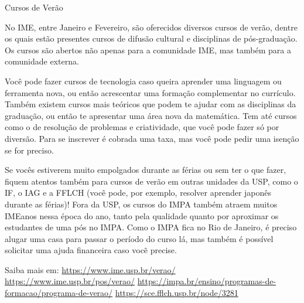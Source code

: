 \begin{secao}{Cursos de Verão}

No IME, entre Janeiro e Fevereiro, são oferecidos diversos cursos de verão,
dentre os quais estão presentes cursos de difusão cultural e disciplinas de
pós-graduação. Os cursos são abertos não apenas para a comunidade IME, mas
também para a comunidade externa.

Você pode fazer cursos de tecnologia caso queira aprender uma linguagem ou ferramenta nova, 
ou então acrescentar uma formação complementar no currículo. Também existem cursos mais teóricos 
que podem te ajudar com as disciplinas da graduação, ou então te apresentar uma área nova da matemática. 
Tem até cursos como o de resolução de problemas e criatividade, que você pode fazer só por diversão. 
Para se inscrever é cobrada uma taxa, mas você pode pedir uma isenção se for preciso. 

Se vocês estiverem muito empolgados durante as férias ou sem ter o que fazer, fiquem atentos também para 
cursos de verão em outras unidades da USP, como o IF, o IAG e a FFLCH (você pode, por exemplo, resolver aprender 
japonês durante as férias)! Fora da USP, os cursos do IMPA também atraem muitos IMEanos nessa época do ano, tanto 
pela qualidade quanto por aproximar os estudantes de uma pós no IMPA. Como o IMPA fica no Rio de Janeiro, é preciso 
alugar uma casa para passar o período do curso lá, mas também é possível solicitar uma ajuda financeira caso vocẽ precise.


Saiba mais em: 
\url{https://www.ime.usp.br/verao/}
\url{https://www.ime.usp.br/pos/verao/}
\url{https://impa.br/ensino/programas-de-formacao/programa-de-verao/}
\url{https://sce.fflch.usp.br/node/3281}

\end{secao}
